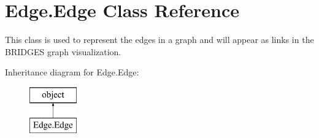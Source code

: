 \hypertarget{class_edge_1_1_edge}{}\section{Edge.\+Edge Class Reference}
\label{class_edge_1_1_edge}


This class is used to represent the edges in a graph and will appear as links in the B\+R\+I\+D\+G\+ES graph visualization.  


Inheritance diagram for Edge.\+Edge\+:\begin{figure}[H]
\begin{center}
\leavevmode
\includegraphics[height=2.000000cm]{class_edge_1_1_edge}
\end{center}
\end{figure}
